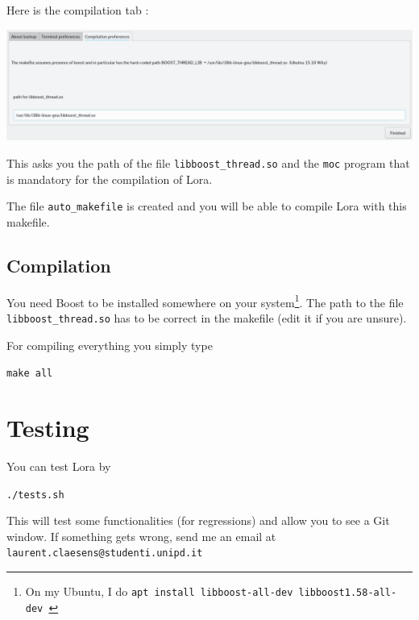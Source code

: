 \documentclass[a4paper,12pt]{article}
\newcommand{\info}[1]{\texttt{#1}}
\begin{document}
Here is the compilation tab :
\begin{center}
    \includegraphics[width=\linewidth]{compilation_tab.png}
\end{center}

This asks you the path of the file \info{libboost\_thread.so} and the \info{moc} program that is mandatory for the compilation of Lora.

The file \info{auto\_makefile} is created and you will be able to compile Lora with this makefile.

\subsection{Compilation}

You need Boost to be installed somewhere on your system\footnote{On my Ubuntu, I do \info{apt install libboost-all-dev  libboost1.58-all-dev }}. The path to the file \info{libboost\_thread.so} has to be correct in the makefile (edit it if you are unsure).

For compiling everything you simply type
\begin{center}
    \info{make all}
\end{center}

\section{Testing}

You can test Lora by
\begin{center}
    \info{./tests.sh}
\end{center}
This will test some functionalities (for regressions) and allow you to see a Git window. If something gets wrong, send me an email at \info{laurent.claesens@studenti.unipd.it}
\end{document}
